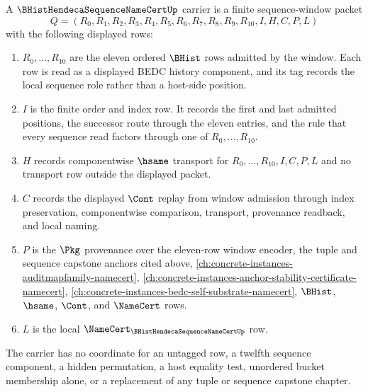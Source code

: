 \begin{definition}
\label{def:b-hist-hendeca-sequence-name-cert-carrier}
A $\BHistHendecaSequenceNameCertUp$ carrier is a finite sequence-window packet
$$
Q=(R_0,R_1,R_2,R_3,R_4,R_5,R_6,R_7,R_8,R_9,R_{10},I,H,C,P,L)
$$
with the following displayed rows:
\begin{enumerate}
\item $R_0,\ldots,R_{10}$ are the eleven ordered $\BHist$ rows admitted by the window. Each row is read as a displayed BEDC history component, and its tag records the local sequence role rather than a host-side position.
\item $I$ is the finite order and index row. It records the first and last admitted positions, the successor route through the eleven entries, and the rule that every sequence read factors through one of $R_0,\ldots,R_{10}$.
\item $H$ records componentwise $\hsame$ transport for $R_0,\ldots,R_{10},I,C,P,L$ and no transport row outside the displayed packet.
\item $C$ records the displayed $\Cont$ replay from window admission through index preservation, componentwise comparison, transport, provenance readback, and local naming.
\item $P$ is the $\Pkg$ provenance over the eleven-row window encoder, the tuple and sequence capstone anchors cited above, \autoref{ch:concrete-instances-auditmapfamily-namecert}, \autoref{ch:concrete-instances-anchor-stability-certificate-namecert}, \autoref{ch:concrete-instances-bedc-self-substrate-namecert}, $\BHist$, $\hsame$, $\Cont$, and $\NameCert$ rows.
\item $L$ is the local $\NameCert_{\BHistHendecaSequenceNameCertUp}$ row.
\end{enumerate}
The carrier has no coordinate for an untagged row, a twelfth sequence component, a hidden permutation, a host equality test, unordered bucket membership alone, or a replacement of any tuple or sequence capstone chapter.
\end{definition}

